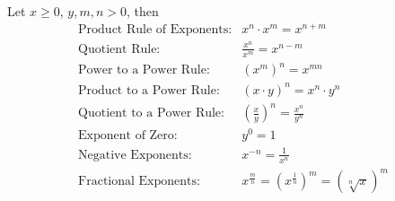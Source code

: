 \documentclass{ximera}
\begin{document}
 \begin{summary}

  Let $x\geq 0$, $y,m,n >0$, then \\

\[
\begin{array}{ll}
\text{Product Rule of Exponents:}&x^{n} \cdot x^{m} = x^{n+m}\\[4ex]
\text{Quotient Rule:}&\frac{x^n}{x^m}=x^{n-m}\\[4ex]
\text{Power to a Power Rule:}&\left(x^{m}\right)^n = x^{mn}\\[4ex]
\text{Product to a Power Rule:}&\left(x \cdot y \right)^{n} = x^{n} \cdot y^{n}\\[4ex]
\text{Quotient to a Power Rule:}&\left(\frac{x}{y}\right)^n=\frac{x^n}{y^n}\\[4ex]
\text{Exponent of Zero:}&y^0=1\\[4ex]
\text{Negative Exponents:}&x^{-n} = \frac{1}{x^{n}}\\[4ex]
\text{Fractional Exponents:}&x^{\frac{m}{n}}=\left(x^{\frac{1}{n}}\right)^m=\left(\sqrt[n]{x}\right)^m
\end{array}
\]

\end{summary}
\end{document}
